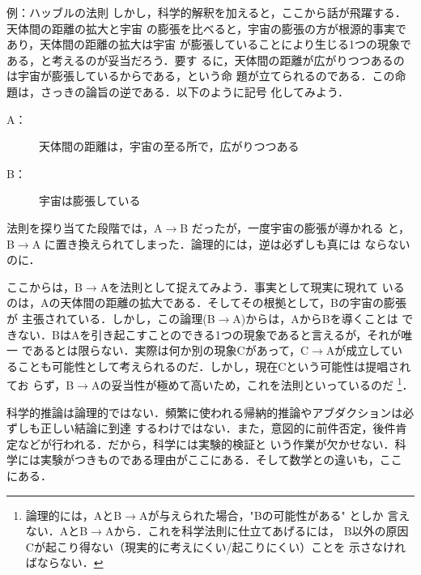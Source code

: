 \begin{memo}{例：ハッブルの法則}
                しかし，科学的解釈を加えると，ここから話が飛躍する．天体間の距離の拡大と宇宙
                の膨張を比べると，宇宙の膨張の方が根源的事実であり，天体間の距離の拡大は宇宙
                が膨張していることにより生じる1つの現象である，と考えるのが妥当だろう．要す
                るに，天体間の距離が広がりつつあるのは宇宙が膨張しているからである，という命
                題が立てられるのである．この命題は，さっきの論旨の逆である．以下のように記号
                化してみよう．
                \begin{description}
                    \item[A：] 天体間の距離は，宇宙の至る所で，広がりつつある
                    \item[B：] 宇宙は膨張している
                \end{description}
                法則を探り当てた段階では，A$\rightarrow$B だったが，一度宇宙の膨張が導かれる
                と，B$\rightarrow$A に置き換えられてしまった．論理的には，逆は必ずしも真には
                ならないのに．

                ここからは，B$\rightarrow$Aを法則として捉えてみよう．事実として現実に現れて
                いるのは，Aの天体間の距離の拡大である．そしてその根拠として，Bの宇宙の膨張が
                主張されている．しかし，この論理(B$\rightarrow$A)からは，AからBを導くことは
                できない．BはAを引き起こすことのできる1つの現象であると言えるが，それが唯一
                であるとは限らない．実際は何か別の現象Cがあって，C$\rightarrow$Aが成立してい
                ることも可能性として考えられるのだ．しかし，現在Cという可能性は提唱されてお
                らず，B$\rightarrow$Aの妥当性が極めて高いため，これを法則といっているのだ
                    \footnote{
                        論理的には，AとB$\rightarrow$Aが与えられた場合，"Bの可能性がある" としか
                        言えない．AとB$\rightarrow$Aから．これを科学法則に仕立てあげるには，
                        B以外の原因Cが起こり得ない（現実的に考えにくい/起こりにくい）ことを
                        示さなければならない．
                    }．

                科学的推論は論理的ではない．頻繁に使われる帰納的推論やアブダクションは必ずしも正しい結論に到達
                するわけではない．また，意図的に前件否定，後件肯定などが行われる．だから，科学には実験的検証と
                いう作業が欠かせない．科学には実験がつきものである理由がここにある．そして数学との違いも，ここ
                にある．


\end{memo}
